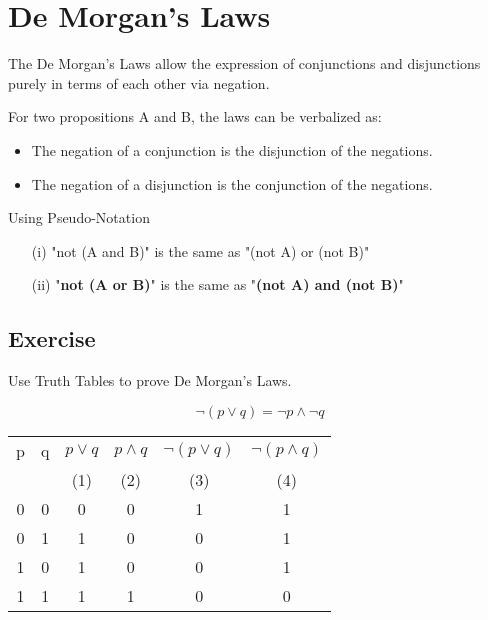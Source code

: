 
\section*{De Morgan's Laws}
The De Morgan's Laws allow the expression of conjunctions and disjunctions purely in terms of each other via negation.
\bigskip

\noindent For two propositions A and B, the laws can be verbalized as:
\begin{itemize}
\item The negation of a conjunction is the disjunction of the negations.
\item The negation of a disjunction is the conjunction of the negations.
\end{itemize}

\begin{framed}
\noindent Using Pseudo-Notation
\begin{itemize}
	\item[(i)]"not (A and B)" is the same as "(not A) or (not B)"
	
	\item[(ii)] "\textbf{not (A or B)}" is the same as "\textbf{(not A) and (not B)}"
\end{itemize}
\end{framed}
\newpage

\subsection{Exercise }Use Truth Tables to prove De Morgan's Laws.
{
	\LARGE
\[  \neg (p \vee q) = \neg p \wedge \neg q\]

}
{
	
\Large
\begin{center}
\begin{tabular}{|c|c||c|c|c|c|}
  \hline
p	&	q	&	$ p \vee q$	&	$ p \wedge q$&	$\neg (p \vee q)$	&	$\neg (p \wedge q)$\\
	&		&	(1)	&	(2)	&	(3)	&	(4)	\\ \hline
\phantom{sp}0\phantom{sp}	&	\phantom{sp}0\phantom{sp}	&	\phantom{sp}0\phantom{sp}	&	\phantom{sp}0\phantom{sp}	&	1	&	1 \\
0	&	1	&	1	&	0	&	0	&	1\\
1	&	0	&	1	&	0	&	0	&	1\\
1	&	1	&	1	&	1	&	\phantom{sp}0\phantom{sp}	&	\phantom{sp}0\phantom{sp}\\
  \hline
\end{tabular}
\end{center}
}
\newpage

